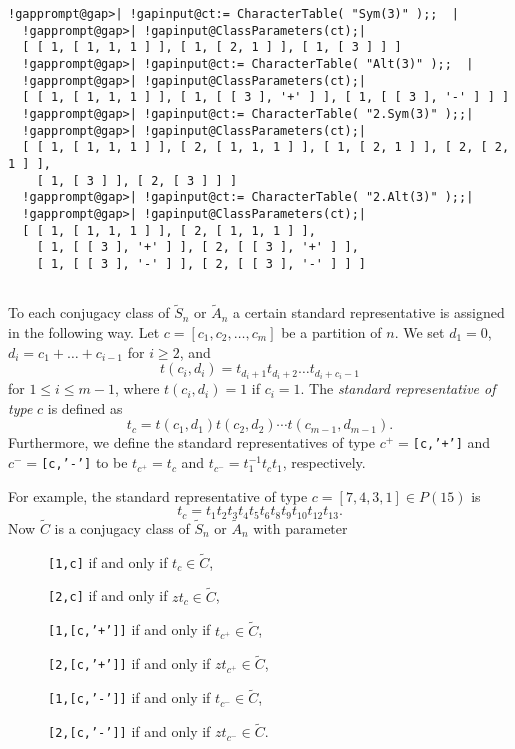 \documentclass[a4paper,11pt]{report}
\begin{document}
{{\begin{Verbatim}[commandchars=!@|,fontsize=\small,frame=single,label=Example]
  !gapprompt@gap>| !gapinput@ct:= CharacterTable( "Sym(3)" );;  |
  !gapprompt@gap>| !gapinput@ClassParameters(ct);|
  [ [ 1, [ 1, 1, 1 ] ], [ 1, [ 2, 1 ] ], [ 1, [ 3 ] ] ]
  !gapprompt@gap>| !gapinput@ct:= CharacterTable( "Alt(3)" );;  |
  !gapprompt@gap>| !gapinput@ClassParameters(ct);|
  [ [ 1, [ 1, 1, 1 ] ], [ 1, [ [ 3 ], '+' ] ], [ 1, [ [ 3 ], '-' ] ] ]
  !gapprompt@gap>| !gapinput@ct:= CharacterTable( "2.Sym(3)" );;|
  !gapprompt@gap>| !gapinput@ClassParameters(ct);|
  [ [ 1, [ 1, 1, 1 ] ], [ 2, [ 1, 1, 1 ] ], [ 1, [ 2, 1 ] ], [ 2, [ 2, 1 ] ], 
    [ 1, [ 3 ] ], [ 2, [ 3 ] ] ]
  !gapprompt@gap>| !gapinput@ct:= CharacterTable( "2.Alt(3)" );;|
  !gapprompt@gap>| !gapinput@ClassParameters(ct);|
  [ [ 1, [ 1, 1, 1 ] ], [ 2, [ 1, 1, 1 ] ], 
    [ 1, [ [ 3 ], '+' ] ], [ 2, [ [ 3 ], '+' ] ], 
    [ 1, [ [ 3 ], '-' ] ], [ 2, [ [ 3 ], '-' ] ] ]
  
\end{Verbatim}
 To each conjugacy class of  $\tilde{S}_n$ or  $\tilde{A}_n$ a certain standard representative is assigned in the following way. Let $c=[c_1,c_2,\ldots,c_m]$ be a partition of $n$. We set $d_1=0$, $d_i=c_1+\ldots +c_{i-1}$ for $i\geq 2$, and 
\[t(c_i,d_i)= t_{d_i+1}t_{d_i+2}\ldots t_{d_i+c_i-1}\]
 for $1\leq i\leq m-1$, where $t(c_i,d_i)= 1$ if $c_i=1$. The \emph{standard representative of type} $c$ is defined as 
\[t_c=t(c_1,d_1)t(c_2,d_2)\cdots t(c_{m-1},d_{m-1}).\]
  Furthermore, we define the standard representatives of type $c^+=$\texttt{[c,'+']} and $c^-=$\texttt{[c,'-']} to be $t_{c^+}=t_{c}$ and $t_{c^-}=t_1^{-1}t_c t_1 $, respectively. 

 For example, the standard representative of type $c=[7,4,3,1]\in P(15)$  is 
\[t_c=t_1t_2t_3t_4t_5t_6t_8t_9t_{10}t_{12}t_{13}.\]
 Now  $\tilde{C}$ is a conjugacy class of  $\tilde{S}_n$ or  $\tilde{A}_n$ with parameter 
\begin{description}
\item[{}] \texttt{[1,c]} if and only if  $t_c\in\tilde{C}$,
\item[{}] \texttt{[2,c]} if and only if  $zt_c\in\tilde{C}$,
\item[{}] \texttt{[1,[c,'+']]} if and only if  $t_{c^+}\in\tilde{C}$,
\item[{}] \texttt{[2,[c,'+']]} if and only if  $zt_{c^+}\in\tilde{C}$,
\item[{}] \texttt{[1,[c,'-']]} if and only if  $t_{c^-}\in\tilde{C}$,
\item[{}] \texttt{[2,[c,'-']]} if and only if  $zt_{c^-}\in\tilde{C}$.
\end{description}
 

}}
\end{document}
